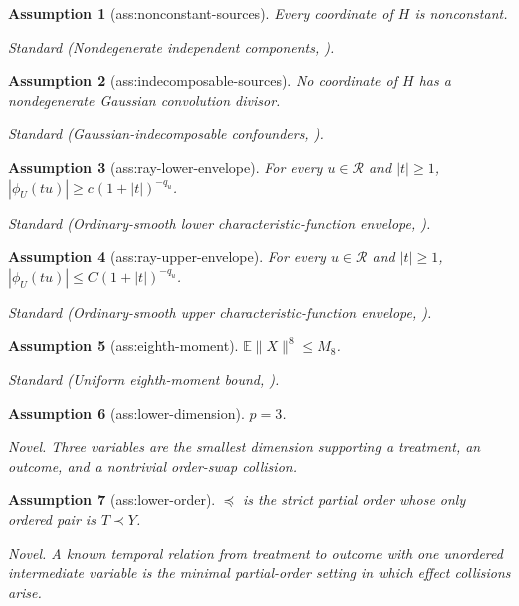 \documentclass{article}
\newtheorem{assumption}{Assumption}
\begin{document}
\begin{assumption}[ass:nonconstant-sources]\label{ass:nonconstant-sources}
Every coordinate of \(H\) is nonconstant.
\par\smallskip\noindent\emph{Standard} (Nondegenerate independent components, \cite{SanjaroonpouriRamazi2025}).
\end{assumption}

\begin{assumption}[ass:indecomposable-sources]\label{ass:indecomposable-sources}
No coordinate of \(H\) has a nondegenerate Gaussian convolution divisor.
\par\smallskip\noindent\emph{Standard} (Gaussian-indecomposable confounders, \cite{SanjaroonpouriRamazi2025}).
\end{assumption}

\begin{assumption}[ass:ray-lower-envelope]\label{ass:ray-lower-envelope}
For every \(u\in\mathcal R\) and \(|t|\ge1\), \(|\phi_U(tu)|\ge c(1+|t|)^{-q_u}\).
\par\smallskip\noindent\emph{Standard} (Ordinary-smooth lower characteristic-function envelope, \cite{Meister2006}).
\end{assumption}

\begin{assumption}[ass:ray-upper-envelope]\label{ass:ray-upper-envelope}
For every \(u\in\mathcal R\) and \(|t|\ge1\), \(|\phi_U(tu)|\le C(1+|t|)^{-q_u}\).
\par\smallskip\noindent\emph{Standard} (Ordinary-smooth upper characteristic-function envelope, \cite{Meister2006}).
\end{assumption}

\begin{assumption}[ass:eighth-moment]\label{ass:eighth-moment}
\(\mathbb E\|X\|^8\le M_8\).
\par\smallskip\noindent\emph{Standard} (Uniform eighth-moment bound, \cite{MiettinenTaskinenNordhausenOja2015}).
\end{assumption}

\begin{assumption}[ass:lower-dimension]\label{ass:lower-dimension}
\(p=3\).
\par\smallskip\noindent\emph{Novel.} Three variables are the smallest dimension supporting a treatment, an outcome, and a nontrivial order-swap collision.
\end{assumption}

\begin{assumption}[ass:lower-order]\label{ass:lower-order}
\(\preceq\) is the strict partial order whose only ordered pair is \(T\prec Y\).
\par\smallskip\noindent\emph{Novel.} A known temporal relation from treatment to outcome with one unordered intermediate variable is the minimal partial-order setting in which effect collisions arise.
\end{assumption}
\end{document}
